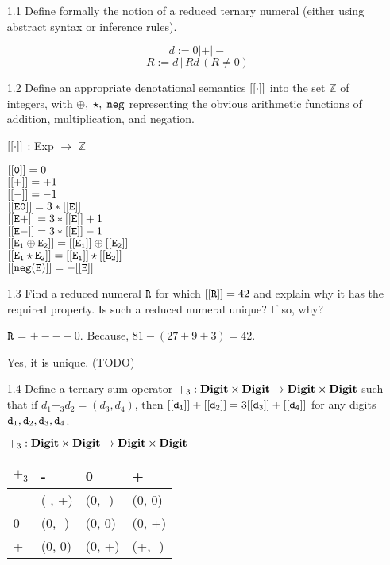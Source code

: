 \documentclass{article}
\begin{document}
\begin{enumerate}
\item[1.1] Define formally the notion of a reduced ternary numeral (either using abstract syntax or inference rules).

$$d := 0 | + | -$$
$$R := d \, | \, Rd \, (R \neq 0)$$


\item[1.2] Define an appropriate denotational semantics $\mathtt{[[{\cdot}]]}$ into the set $\mathbb{Z}$ of integers, with $\oplus, \; \star, \; \mathtt{neg}$ representing the obvious arithmetic functions of addition, multiplication, and negation.

$\mathtt{[[{\cdot}]]}$ : Exp $\rightarrow$  $\mathbb{Z}$

$\mathtt{[[{0}]]} = 0$\\
$\mathtt{[[{+}]]} = +1$\\
$\mathtt{[[{-}]]} = -1$\\

$\mathtt{[[{E0}]]} = 3*\mathtt{[[{E}]]}$ \\
$\mathtt{[[{E+}]]} = 3*\mathtt{[[{E}]]} + 1 $ \\
$\mathtt{[[{E-}]]} = 3*\mathtt{[[{E}]]} - 1$ \\

$\mathtt{[[{E_{1} \oplus E_{2}}]]} = \mathtt{[[{E_{1}}]]} \oplus \mathtt{[[{E_{2}}]]}$\\
$\mathtt{[[{E_{1} \star E_{2}}]]} = \mathtt{[[{E_{1}}]]} \star \mathtt{[[{E_{2}}]]}$\\
$\mathtt{[[{neg(E)}]]} = -\mathtt{[[{E}]]}$\\

\item[1.3] Find a reduced numeral $\mathtt{R}$ for which $\mathtt{[[{\mathtt{R}}]]} = 42$ and explain why it has the required property. Is such a reduced numeral unique? If so, why?

$\mathtt{R}$ = $+---0$. 
Because, $81 - (27 + 9 + 3) = 42$.

Yes, it is unique. (TODO)

\item[1.4] Define a ternary sum operator $+_3 : \mathbf{Digit} \times \mathbf{Digit} \to \mathbf{Digit} \times \mathbf{Digit}$ such that if $d_1 +_3 d_2 = (d_3,d_4)$, then $\mathtt{[[{\mathtt{d}_1}]]} + \mathtt{[[{\mathtt{d}_2}]]} = 3
\mathtt{[[{\mathtt{d}_3}]]} + \mathtt{[[{\mathtt{d}_4}]]}$ for any digits $\mathtt{d}_1, \mathtt{d}_2, \mathtt{d}_3, \mathtt{d}_4$.

$+_3 : \mathbf{Digit} \times \mathbf{Digit} \to \mathbf{Digit} \times \mathbf{Digit}$ 

\begin{tabular}{l|lll}
$+_3$ & - & 0 & + \\
\hline
- & (-, +) & (0, -) & (0, 0) \\
0 & (0, -) & (0, 0) & (0, +) \\
+ & (0, 0) & (0, +) & (+, -) \\
\end{tabular}



\end{enumerate}
\end{document}
